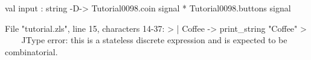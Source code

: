 \runverbatimfalse
{}
\begin{RunVerbatimMsg}
val input :
  string -D-> Tutorial0098.coin signal * Tutorial0098.buttons signal
\end{RunVerbatimMsg}
\begin{RunVerbatimErr}
File "tutorial.zls", line 15, characters 14-37:
>  | Coffee -> print_string "Coffee\n"
>              ^^^^^^^^^^^^^^^^^^^^^^^
Type error: this is a stateless discrete expression and is expected to be combinatorial.
\end{RunVerbatimErr}
